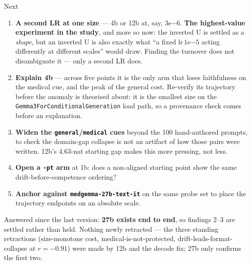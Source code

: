 \documentclass[aspectratio=169,10pt]{beamer}
\newcommand{\bad}[1]{\textcolor{down}{#1}}
\begin{document}
\begin{frame}{Next}
  \begin{enumerate}\setlength{\itemsep}{0.3em}
    \item \bad{\textbf{A second LR at one size}} --- 4b or 12b at, say,
      $3\mathrm{e}{-6}$. \textbf{The highest-value experiment in the study}, and
      more so now: the inverted U is settled as a \emph{shape}, but an inverted U
      is also exactly what ``a fixed lr\,$1\mathrm{e}{-5}$ acting differently at
      different scales'' would draw. Finding the turnover does not disambiguate
      it --- only a second LR does.
    \item \bad{\textbf{Explain 4b}} --- across five points it is the only arm
      that loses faithfulness on the medical cue, and the peak of the general
      cost. Re-verify its trajectory before the anomaly is theorised about: it is
      the smallest size on the \texttt{Gemma3ForConditionalGeneration} load path,
      so a provenance check comes before an explanation.
    \item \textbf{Widen the \texttt{general}/\texttt{medical} cues} beyond the
      100 hand-authored prompts, to check the domain-gap collapse is not an
      artifact of how those pairs were written. 12b's $4.63$-nat starting gap
      makes this more pressing, not less.
    \item \textbf{Open a \texttt{-pt} arm} at 1b: does a non-aligned starting
      point show the same drift-before-competence ordering?
    \item \textbf{Anchor against \texttt{medgemma-27b-text-it}} on the same
      probe set to place the trajectory endpoints on an absolute scale.
  \end{enumerate}
  \vfill
  {\scriptsize Answered since the last version: \textbf{27b exists end to end}, so
  findings 2--3 are settled rather than held. \bad{Nothing newly retracted} ---
  the three standing retractions (size-monotone cost, medical-is-not-protected,
  drift-leads-format-collapse at $r{=}-0.91$) were made by 12b and the decode
  fix; 27b only confirms the first two.}
\end{frame}
\end{document}
